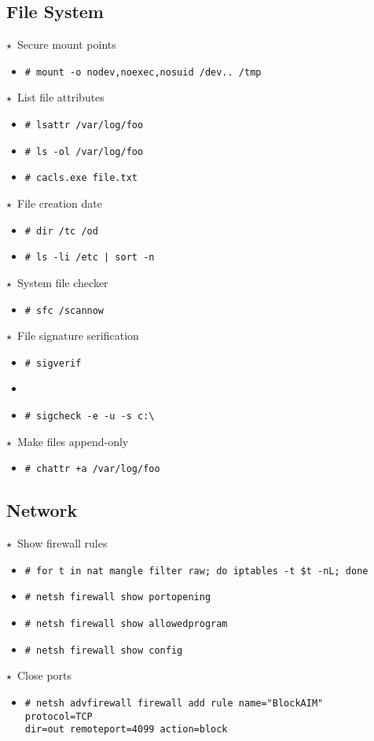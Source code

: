 \documentclass[10pt,landscape]{article}
\newcommand{\os}[1]{\texttt{\footnotesize{#1}}}
\newcommand{\bsd}{\os{B}}
\newcommand{\unix}{\os{U}}
\newcommand{\linux}{\os{L}}
\newcommand{\windows}{\os{W}}
\newenvironment{action}[1]
  {\begin{minipage}[c]{\linewidth}$\star$~#1\begin{itemize}[leftmargin=1cm]}
  {\end{itemize}\end{minipage}\vspace*{3pt}}
\newcommand{\cmd}[2]{\item[#1] {\small\tt\# #2}}
\newcommand{\tool}[2]{\item[#1] {\footnotesize\sc{#2}}\xspace}
\begin{document}
\begin{multicols*}{3}
\subsection*{File System}

\begin{action}{Secure mount points}
\cmd{\unix}{mount -o nodev,noexec,nosuid /dev.. /tmp}
\end{action}

\begin{action}{List file attributes}
\cmd{\linux}{lsattr /var/log/foo}
\cmd{\bsd}{ls -ol /var/log/foo}
\cmd{\windows}{cacls.exe file.txt}
\end{action}

\begin{action}{File creation date}
\cmd{\windows}{dir /tc /od}
\cmd{\unix}{ls -li /etc | sort -n}
\end{action}

\begin{action}{System file checker }
\cmd{\windows}{sfc /scannow}
\end{action}

\begin{action}{File signature serification}
\cmd{\windows}{sigverif}
\tool{\windows}{sigcheck}
\cmd{\windows}{sigcheck -e -u -s c:{\textbackslash} }
\end{action}

\begin{action}{Make files append-only}
\cmd{\linux}{chattr +a /var/log/foo}
\end{action}

\subsection*{Network}

\begin{action}{Show firewall rules}
\cmd{\linux}{for t in nat mangle filter raw; do iptables -t \$t -nL; done}
\cmd{\windows}{netsh firewall show portopening}
\cmd{\windows}{netsh firewall show allowedprogram}
\cmd{\windows}{netsh firewall show config}
\end{action}

\begin{action}{Close ports}
\cmd{\windows}{netsh advfirewall firewall add rule name="BlockAIM" \\
protocol=TCP\\
dir=out remoteport=4099 action=block}
\end{action}


\end{multicols*}
\end{document}
